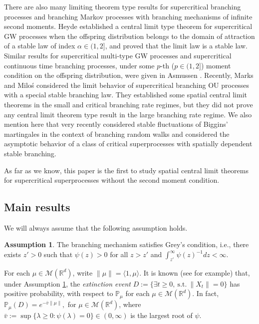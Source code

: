 \documentclass[12pt,a4paper]{amsart}
\theoremstyle{plain}
\theoremstyle{definition}
\newtheorem{asp}{Assumption}
\numberwithin{equation}{section}
\begin{document}
There are also many limiting theorem type results for supercritical branching processes and branching Markov processes with branching mechanisms of infinite second moments.
Heyde \cite{Heyde1971Some} established a central limit type  theorem 
for supercritical GW processes when the offspring distribution
belongs to the domain of attraction of a stable law of index $\alpha\in (1, 2]$,
and   proved that the limit law is  a stable law. Similar results  for supercritical multi-type 
GW processes and supercritical  continuous time branching processes, 
under some $p$-th ($p\in(1,2]$) moment condition on the offspring distribution,
were given in Asmussen \cite{Asmussen76Convergence}.
Recently,   Marks and Milo\'s \cite{MarksMilos2018CLT}
considered the limit behavior of supercritical branching OU processes
with a special stable branching law.
	They established some spatial central limit theorems in the small and critical branching rate regimes,
    but they did not prove any central limit theorem type result in the large branching rate regime.
    We also mention here that very recently \cite{IksanovKoleskoMeiners2018Stable-like} considered stable fluctuations of Biggins' martingales in the context of branching random walks and \cite{RenSongSun2018Limit} considered the asymptotic behavior of a class of critical superprocesses with spatially dependent stable branching.

    As far as we know, this paper is the
   first to study spatial central limit theorems
    for supercritical superprocesses without the second moment condition.


\subsection{Main results}
\label{sec: main results}{}

We will always assume that the following assumption holds.
\begin{asp}
\label{asp: Greys condition}
	The branching mechanism satisfies Grey's condition, i.e., there exists $z' > 0$ such that $\psi(z) > 0$ for all $z>z'$ and  $\int_{z'}^\infty \psi(z)^{-1}dz < \infty$.
\end{asp}
    For each $\mu \in \mathcal M(\mathbb R^d)$, write $\|\mu\| = \langle 1, \mu\rangle$.
	It is known (see \cite[Theorems 12.5 \& 12.7]{Kyprianou2014Fluctuations} for example) that, under Assumption \ref{asp: Greys condition},
	the \emph{extinction event}
	$D:=\{\exists t\geq 0,~\text{s.t.}~\|X_t\|=0\}$ has positive probability, with respect to $\mathbb P_\mu$ for each  $\mu \in \mathcal M(\mathbb R^d)$.
    In fact,
$
    \mathbb{P}_{\mu} (D)
    = e^{-\bar v \|\mu\|},
$ for $\mu\in \mathcal M(\mathbb R^d)$,
    where
$
	\bar v := \sup\{\lambda \geq 0: \psi(\lambda) = 0\} \in (0,\infty)
$
	is the largest root of $\psi$.
\end{document}
